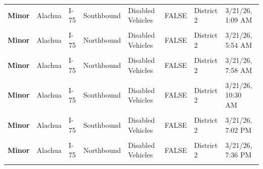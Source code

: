 \documentclass[
]{article}
\begin{document}
\begin{longtable}[t]{>{\raggedright\arraybackslash}p{1.5cm}>{\raggedright\arraybackslash}p{2.5cm}>{\raggedright\arraybackslash}p{3cm}>{\raggedright\arraybackslash}p{1.8cm}>{\raggedright\arraybackslash}p{2.5cm}lll}
\textbf{Minor} & Alachua & I-75 & Southbound & Disabled Vehicles & FALSE & District 2 & 3/21/26, 1:09 AM\\
\textbf{\cellcolor{gray!10}{Minor}} & \cellcolor{gray!10}{Alachua} & \cellcolor{gray!10}{I-75} & \cellcolor{gray!10}{Southbound} & \cellcolor{gray!10}{Disabled Vehicles} & \cellcolor{gray!10}{FALSE} & \cellcolor{gray!10}{District 2} & \cellcolor{gray!10}{3/21/26, 5:45 AM}\\
\textbf{Minor} & Alachua & I-75 & Northbound & Disabled Vehicles & FALSE & District 2 & 3/21/26, 5:54 AM\\
\textbf{\cellcolor{gray!10}{Minor}} & \cellcolor{gray!10}{Alachua} & \cellcolor{gray!10}{I-75} & \cellcolor{gray!10}{Southbound} & \cellcolor{gray!10}{Disabled Vehicles} & \cellcolor{gray!10}{FALSE} & \cellcolor{gray!10}{District 2} & \cellcolor{gray!10}{3/21/26, 7:33 AM}\\
\addlinespace
\textbf{Minor} & Alachua & I-75 & Northbound & Disabled Vehicles & FALSE & District 2 & 3/21/26, 7:58 AM\\
\textbf{\cellcolor{gray!10}{Minor}} & \cellcolor{gray!10}{Alachua} & \cellcolor{gray!10}{I-75} & \cellcolor{gray!10}{Southbound} & \cellcolor{gray!10}{Incidents} & \cellcolor{gray!10}{FALSE} & \cellcolor{gray!10}{District 2} & \cellcolor{gray!10}{3/21/26, 9:35 AM}\\
\textbf{Minor} & Alachua & I-75 & Southbound & Disabled Vehicles & FALSE & District 2 & 3/21/26, 10:30 AM\\
\textbf{\cellcolor{gray!10}{Minor}} & \cellcolor{gray!10}{Alachua} & \cellcolor{gray!10}{I-75} & \cellcolor{gray!10}{Southbound} & \cellcolor{gray!10}{Disabled Vehicles} & \cellcolor{gray!10}{FALSE} & \cellcolor{gray!10}{District 2} & \cellcolor{gray!10}{3/21/26, 6:24 PM}\\
\textbf{Minor} & Alachua & I-75 & Southbound & Disabled Vehicles & FALSE & District 2 & 3/21/26, 7:02 PM\\
\addlinespace
\textbf{\cellcolor{gray!10}{Minor}} & \cellcolor{gray!10}{Alachua} & \cellcolor{gray!10}{I-75} & \cellcolor{gray!10}{Southbound} & \cellcolor{gray!10}{Incidents} & \cellcolor{gray!10}{FALSE} & \cellcolor{gray!10}{District 2} & \cellcolor{gray!10}{3/21/26, 7:08 PM}\\
\textbf{Minor} & Alachua & I-75 & Northbound & Disabled Vehicles & FALSE & District 2 & 3/21/26, 7:36 PM\\
\textbf{\cellcolor{gray!10}{Minor}} & \cellcolor{gray!10}{Alachua} & \cellcolor{gray!10}{I-75} & \cellcolor{gray!10}{Southbound} & \cellcolor{gray!10}{Disabled Vehicles} & \cellcolor{gray!10}{FALSE} & \cellcolor{gray!10}{District 2} & \cellcolor{gray!10}{3/22/26, 3:45 AM}\\

\end{longtable}
\end{document}
